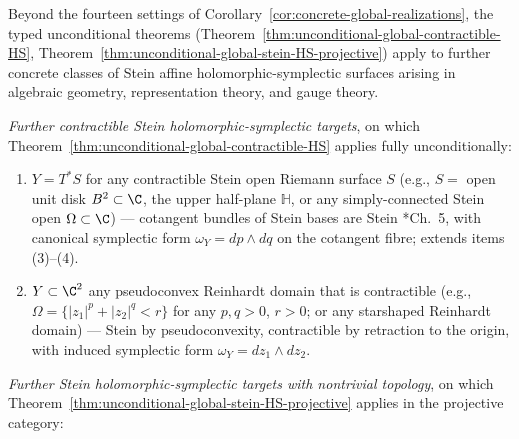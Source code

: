 \begin{cor}
\label{cor:additional-concrete-realizations}

Beyond the fourteen settings of
Corollary~\ref{cor:concrete-global-realizations}, the typed
unconditional theorems
(Theorem~\ref{thm:unconditional-global-contractible-HS},
Theorem~\ref{thm:unconditional-global-stein-HS-projective}) apply to
further concrete classes of Stein affine holomorphic-symplectic
surfaces arising in algebraic geometry, representation theory, and
gauge theory.

\medskip
\noindent\emph{Further contractible Stein holomorphic-symplectic targets},
on which Theorem~\ref{thm:unconditional-global-contractible-HS}
applies fully unconditionally:

\begin{enumerate}[label=\textup{(\arabic*)},start=14]
  \item \(Y=T^*S\) for any contractible Stein open Riemann surface
        $S$ (e.g., $S=$ open unit disk $B^2\subset\C$, the upper
        half-plane $\mathbb H$, or any simply-connected Stein open
        $\Omega\subset\C$) --- cotangent bundles of Stein bases are
        Stein \cite{hormander-vol1}*{Ch.~5}, with canonical
        symplectic form $\omega_Y=dp\wedge dq$ on the cotangent
        fibre; extends items (3)--(4).
  \item \(Y\subset\C^2\) any pseudoconvex Reinhardt domain that is
        contractible (e.g., \(\Omega=\{|z_1|^p+|z_2|^q<r\}\) for any
        $p,q>0$, $r>0$; or any starshaped Reinhardt domain) --- Stein
        by pseudoconvexity, contractible by retraction to the origin,
        with induced symplectic form
        \(\omega_Y=dz_1\wedge dz_2\).
\end{enumerate}

\medskip
\noindent\emph{Further Stein holomorphic-symplectic targets with
nontrivial topology}, on which
Theorem~\ref{thm:unconditional-global-stein-HS-projective} applies
in the projective category:


\end{cor}
